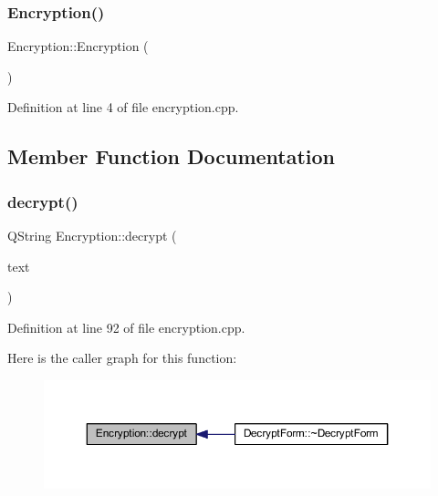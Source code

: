 \subsubsection{\texorpdfstring{Encryption()}{Encryption()}}
{\footnotesize\ttfamily Encryption\+::\+Encryption (\begin{DoxyParamCaption}{ }\end{DoxyParamCaption})}



Definition at line 4 of file encryption.\+cpp.



\subsection{Member Function Documentation}
\hypertarget{class_encryption_aa52a864985f89af118c61a4a3173fd72}{}\label{class_encryption_aa52a864985f89af118c61a4a3173fd72} 
\subsubsection{\texorpdfstring{decrypt()}{decrypt()}}
{\footnotesize\ttfamily Q\+String Encryption\+::decrypt (\begin{DoxyParamCaption}\item[{Q\+String}]{text }\end{DoxyParamCaption})}



Definition at line 92 of file encryption.\+cpp.

Here is the caller graph for this function\+:\nopagebreak
\begin{figure}[H]
\begin{center}
\leavevmode
\includegraphics[width=350pt]{class_encryption_aa52a864985f89af118c61a4a3173fd72_icgraph}
\end{center}
\end{figure}
\hypertarget{class_encryption_a764237662a4daa19502e6454126fa279}{}\label{class_encryption_a764237662a4daa19502e6454126fa279} 
